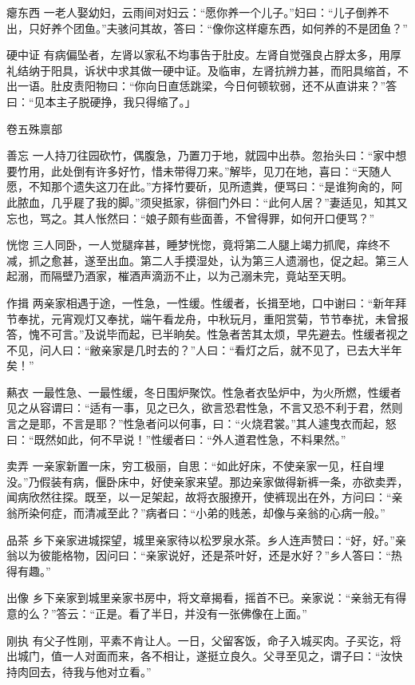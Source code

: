 \documentclass[12pt,UTF8]{ctexbook}
\begin{document}
瘪东西
一老人娶幼妇，云雨间对妇云：“愿你养一个儿子。”妇曰：“儿子倒养不出，只好养个团鱼。”夫骇问其故，答曰：“像你这样瘪东西，如何养的不是团鱼？”

硬中证
有病偏坠者，左肾以家私不均事告于肚皮。左肾自觉强良占脬太多，用厚礼结纳于阳具，诉状中求其做一硬中证。及临审，左肾抗辨力甚，而阳具缩首，不出一语。肚皮责阳物曰：“你向日直恁跳梁，今日何顿软弱，还不从直讲来？”答曰：“见本主子脱硬挣，我只得缩了。」

卷五殊禀部

善忘
一人持刀往园砍竹，偶腹急，乃置刀于地，就园中出恭。忽抬头曰：“家中想要竹用，此处倒有许多好竹，惜未带得刀来。”解毕，见刀在地，喜曰：“天随人愿，不知那个遗失这刀在此。”方择竹要斫，见所遗粪，便骂曰：“是谁狗肏的，阿此脓血，几乎屣了我的脚。”须臾抵家，徘徊门外曰：“此何人居？”妻适见，知其又忘也，骂之。其人怅然曰：“娘子颇有些面善，不曾得罪，如何开口便骂？”

恍惚
三人同卧，一人觉腿痒甚，睡梦恍惚，竟将第二人腿上竭力抓爬，痒终不减，抓之愈甚，遂至出血。第二人手摸湿处，认为第三人遗溺也，促之起。第三人起溺，而隔壁乃酒家，槯酒声滴沥不止，以为己溺未完，竟站至天明。

作揖
两亲家相遇于途，一性急，一性缓。性缓者，长揖至地，口中谢曰：“新年拜节奉扰，元宵观灯又奉扰，端午看龙舟，中秋玩月，重阳赏菊，节节奉扰，未曾报答，愧不可言。”及说毕而起，已半晌矣。性急者苦其太烦，早先避去。性缓者视之不见，问人曰：“敝亲家是几时去的？”人曰：“看灯之后，就不见了，已去大半年矣！”

爇衣
一最性急、一最性缓，冬日围炉聚饮。性急者衣坠炉中，为火所燃，性缓者见之从容谓曰：“适有一事，见之已久，欲言恐君性急，不言又恐不利于君，然则言之是耶，不言是耶？”性急者问以何事，曰：“火烧君裳。”其人遽曳衣而起，怒曰：“既然如此，何不早说！”性缓者曰：“外人道君性急，不料果然。”

卖弄
一亲家新置一床，穷工极丽，自思：“如此好床，不使亲家一见，枉自埋没。”乃假装有病，偃卧床中，好使亲家来望。那边亲家做得新裤一条，亦欲卖弄，闻病欣然往探。既至，以一足架起，故将衣服撩开，使裤现出在外，方问曰：“亲翁所染何症，而清减至此？”病者曰：“小弟的贱恙，却像与亲翁的心病一般。”

品茶
乡下亲家进城探望，城里亲家待以松罗泉水茶。乡人连声赞曰：“好，好。”亲翁以为彼能格物，因问曰：“亲家说好，还是茶叶好，还是水好？”乡人答曰：“热得有趣。”

出像
乡下亲家到城里亲家书房中，将文章揭看，摇首不已。亲家说：“亲翁无有得意的么？”答云：“正是。看了半日，并没有一张佛像在上面。”

刚执
有父子性刚，平素不肯让人。一日，父留客饭，命子入城买肉。子买讫，将出城门，值一人对面而来，各不相让，遂挺立良久。父寻至见之，谓子曰：“汝快持肉回去，待我与他对立看。”
\end{document}
